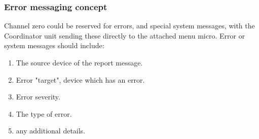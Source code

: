 \documentclass{article}
\begin{document}
     \subsubsection{Error messaging concept}
     Channel zero could be reserved for errors, and special system messages,
     with the Coordinator unit sending these directly to the attached menu micro.
     Error or system messages should include:
     \begin{enumerate}
     	\item The source device of the report message.
     	\item Error "target", device which has an error.
     	\item Error severity.
     	\item The type of error.
     	\item any additional details.
     \end{enumerate}
\end{document}
